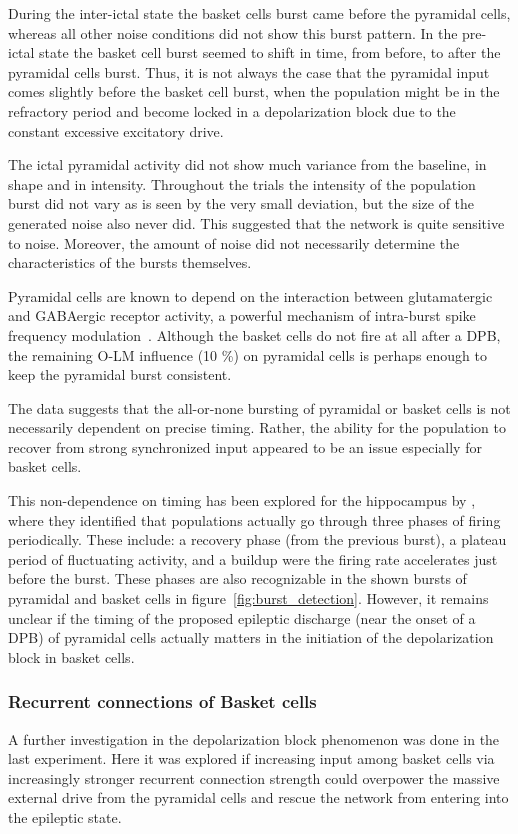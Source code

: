 During the inter-ictal state the basket cells burst came before the pyramidal cells, whereas all other noise conditions did not show this burst pattern.
In the pre-ictal state the basket cell burst seemed to shift in time, from before, to after the pyramidal cells burst.
Thus, it is not always the case that the pyramidal input comes slightly before the basket cell burst, when the population might be in the refractory period and become locked in a depolarization block
due to the constant excessive excitatory drive.

The ictal pyramidal activity did not show much variance from the baseline, in shape and in intensity.
Throughout the trials the intensity of the population burst did not vary as is seen by the very small deviation, but the size of the generated noise also never did.
This suggested that the network is quite sensitive to noise. Moreover, the amount of noise did not necessarily determine the characteristics of the bursts themselves.

Pyramidal cells are known to depend on the interaction between glutamatergic and GABAergic receptor activity, a powerful mechanism
of intra-burst spike frequency modulation~\parencite{dzhalaExcitatoryActionsEndogenously2003}. Although the basket cells do not fire at all after a DPB, the remaining O-LM influence (10 \%)
on pyramidal cells is perhaps enough to keep the pyramidal burst consistent.

The data suggests that the all-or-none bursting of pyramidal or basket cells is not necessarily dependent on precise timing.
Rather, the ability for the population to recover from strong synchronized input appeared to be an issue especially for basket cells.

This non-dependence on timing has been explored for the hippocampus by \textcite{menendezdelapridaThresholdBehaviorInitiation2006}, where
they identified that populations actually go through three phases of firing periodically. These include: a recovery phase (from the previous burst), a plateau period of fluctuating activity,
and a buildup were the firing rate accelerates just before the burst. These phases are also recognizable in the shown bursts of pyramidal and basket cells in figure~\ref{fig:burst_detection}.
However, it remains unclear if the timing of the proposed epileptic discharge (near the onset of a DPB) of pyramidal cells actually matters in the initiation of the depolarization block in basket cells.

\subsubsection{Recurrent connections of Basket cells}
A further investigation in the depolarization block phenomenon was done in the last experiment.
Here it was explored if increasing input among basket cells via increasingly stronger recurrent connection strength
could overpower the massive external drive from the pyramidal cells and rescue the network from entering into the epileptic state.

